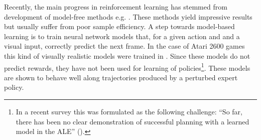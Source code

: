 Recently, the main progress in reinforcement learning has stemmed from development of model-free methods e.g. \cite{rainbow, ppo, acktr}.
These methods yield impressive results but usually suffer from poor sample efficiency.
%
%
A step towards model-based learning is to train neural network models that, for a given action and and a visual input, correctly predict the next frame.  In the case of Atari 2600 games this kind of visually realistic models were trained in \cite{video_prediction,recurrent}. Since these models do not predict rewards,  they have not been used for learning of policies\footnote{In a recent survey \cite{ale2} this was formulated as the following challenge: ``So far, there has been no clear demonstration of successful planning with a learned model in the ALE'' (\cite[Section 7.2]{ale2}).}.
These models are shown to behave well along trajectories produced by a perturbed expert policy.

